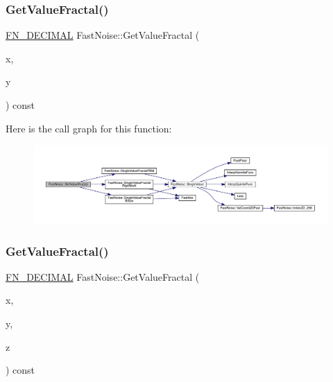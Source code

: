 \subsubsection{\texorpdfstring{Get\+Value\+Fractal()}{GetValueFractal()}\hspace{0.1cm}{\footnotesize\ttfamily [1/2]}}
{\footnotesize\ttfamily \mbox{\hyperlink{_fast_noise_8h_a75a9ef6d2541c4921815b885bfd449c3}{F\+N\+\_\+\+D\+E\+C\+I\+M\+AL}} Fast\+Noise\+::\+Get\+Value\+Fractal (\begin{DoxyParamCaption}\item[{\mbox{\hyperlink{_fast_noise_8h_a75a9ef6d2541c4921815b885bfd449c3}{F\+N\+\_\+\+D\+E\+C\+I\+M\+AL}}}]{x,  }\item[{\mbox{\hyperlink{_fast_noise_8h_a75a9ef6d2541c4921815b885bfd449c3}{F\+N\+\_\+\+D\+E\+C\+I\+M\+AL}}}]{y }\end{DoxyParamCaption}) const}

Here is the call graph for this function\+:
\nopagebreak
\begin{figure}[H]
\begin{center}
\leavevmode
\includegraphics[width=350pt]{d1/dd8/class_fast_noise_a637789887aa7727d701d9dbcb261a170_cgraph}
\end{center}
\end{figure}
\mbox{\label{class_fast_noise_a972ef8f462048015489604783155fd17}} 
\subsubsection{\texorpdfstring{Get\+Value\+Fractal()}{GetValueFractal()}\hspace{0.1cm}{\footnotesize\ttfamily [2/2]}}
{\footnotesize\ttfamily \mbox{\hyperlink{_fast_noise_8h_a75a9ef6d2541c4921815b885bfd449c3}{F\+N\+\_\+\+D\+E\+C\+I\+M\+AL}} Fast\+Noise\+::\+Get\+Value\+Fractal (\begin{DoxyParamCaption}\item[{\mbox{\hyperlink{_fast_noise_8h_a75a9ef6d2541c4921815b885bfd449c3}{F\+N\+\_\+\+D\+E\+C\+I\+M\+AL}}}]{x,  }\item[{\mbox{\hyperlink{_fast_noise_8h_a75a9ef6d2541c4921815b885bfd449c3}{F\+N\+\_\+\+D\+E\+C\+I\+M\+AL}}}]{y,  }\item[{\mbox{\hyperlink{_fast_noise_8h_a75a9ef6d2541c4921815b885bfd449c3}{F\+N\+\_\+\+D\+E\+C\+I\+M\+AL}}}]{z }\end{DoxyParamCaption}) const}

